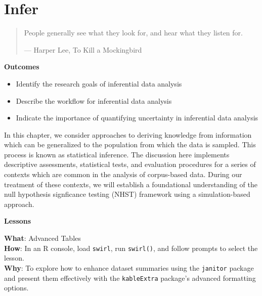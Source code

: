 \documentclass[
  letterpaper,
]{latex/krantz}
\providecommand{\tightlist}{%
  \setlength{\itemsep}{0pt}\setlength{\parskip}{0pt}}\usepackage{longtable,booktabs,array}
\theoremstyle{definition}
\theoremstyle{remark}
\begin{document}
\chapter{Infer}\label{sec-infer-chapter}

\begin{quote}
People generally see what they look for, and hear what they listen for.

--- Harper Lee, To Kill a Mockingbird
\end{quote}

\begin{tcolorbox}[enhanced jigsaw, colframe=quarto-callout-color-frame, breakable, bottomrule=.15mm, arc=.35mm, left=2mm, opacityback=0, rightrule=.15mm, colback=white, toprule=.15mm, leftrule=.75mm]

\textbf{ Outcomes}

\begin{itemize}
\tightlist
\item
  Identify the research goals of inferential data analysis
\item
  Describe the workflow for inferential data analysis
\item
  Indicate the importance of quantifying uncertainty in inferential data
  analysis
\end{itemize}

\end{tcolorbox}

In this chapter, we consider approaches to deriving knowledge from
information which can be generalized to the population from which the
data is sampled. This process is known as statistical inference. The
discussion here implements descriptive assessments, statistical tests,
and evaluation procedures for a series of contexts which are common in
the analysis of corpus-based data. During our treatment of these
contexts, we will establish a foundational understanding of the null
hypothesis signficance testing (NHST) framework using a simulation-based
approach.

\begin{tcolorbox}[enhanced jigsaw, colframe=quarto-callout-color-frame, breakable, bottomrule=.15mm, arc=.35mm, left=2mm, opacityback=0, rightrule=.15mm, colback=white, toprule=.15mm, leftrule=.75mm]

\textbf{ Lessons}

\textbf{What}: Advanced Tables\\
\textbf{How}: In an R console, load \texttt{swirl}, run
\texttt{swirl()}, and follow prompts to select the lesson.\\
\textbf{Why}: To explore how to enhance dataset summaries using the
\texttt{janitor} package and present them effectively with the
\texttt{kableExtra} package's advanced formatting options.

\end{tcolorbox}
\end{document}
